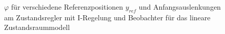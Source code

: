 \begin{figure}[H]
    \centering
    \caption[$\varphi$ für Regler mit I-Regelung und Beobachter (linear)]{$\varphi$ für verschiedene Referenzpositionen $y_{ref}$ und Anfangsauslenkungen am Zustandsregler mit I-Regelung und Beobachter für das lineare Zustandsraummodell}
    \label{fig:Bild53}
\end{figure}

